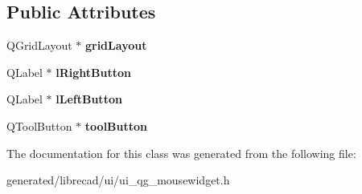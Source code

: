 \subsection*{Public Attributes}
\begin{DoxyCompactItemize}
\item 
\hypertarget{classUi__QG__MouseWidget_a0de9fffaf043bfeafd1cf4e041ecc2a0}{Q\-Grid\-Layout $\ast$ {\bfseries grid\-Layout}}\label{classUi__QG__MouseWidget_a0de9fffaf043bfeafd1cf4e041ecc2a0}

\item 
\hypertarget{classUi__QG__MouseWidget_a4c97b1fd5f2fb94929fcfb0a1ca787e9}{Q\-Label $\ast$ {\bfseries l\-Right\-Button}}\label{classUi__QG__MouseWidget_a4c97b1fd5f2fb94929fcfb0a1ca787e9}

\item 
\hypertarget{classUi__QG__MouseWidget_adddf491914661cbe72fad046204f971f}{Q\-Label $\ast$ {\bfseries l\-Left\-Button}}\label{classUi__QG__MouseWidget_adddf491914661cbe72fad046204f971f}

\item 
\hypertarget{classUi__QG__MouseWidget_a188e3f1020813c1abde90977e75d5ab2}{Q\-Tool\-Button $\ast$ {\bfseries tool\-Button}}\label{classUi__QG__MouseWidget_a188e3f1020813c1abde90977e75d5ab2}

\end{DoxyCompactItemize}


The documentation for this class was generated from the following file\-:\begin{DoxyCompactItemize}
\item 
generated/librecad/ui/ui\-\_\-qg\-\_\-mousewidget.\-h\end{DoxyCompactItemize}
